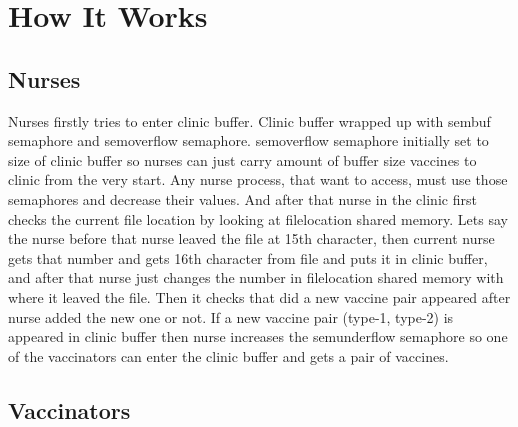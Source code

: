 \documentclass{article}
\begin{document}
\section{How It Works}
\subsection{Nurses}   
\par\hspace{\parindent} Nurses firstly tries to enter clinic buffer. Clinic buffer wrapped up with sem\textunderscore buf semaphore and sem\textunderscore overflow semaphore. sem\textunderscore overflow semaphore initially set to size of clinic buffer so nurses can just carry amount of buffer size vaccines to clinic from the very start. Any nurse process, that want to access, must use those semaphores and decrease their values. And after that nurse in the clinic first checks the current file location by looking at filelocation shared memory. Lets say the nurse before that nurse leaved the file at 15th character, then current nurse gets that number and gets 16th character from file and puts it in clinic buffer, and after that nurse just changes the number in filelocation shared memory with where it leaved the file. Then it checks that did a new vaccine pair appeared after nurse added the new one or not. If a new vaccine pair (type-1, type-2) is appeared in clinic buffer then nurse increases the sem\textunderscore underflow semaphore so one of the vaccinators can enter the clinic buffer and gets a pair of vaccines.


\subsection{Vaccinators}
\end{document}
